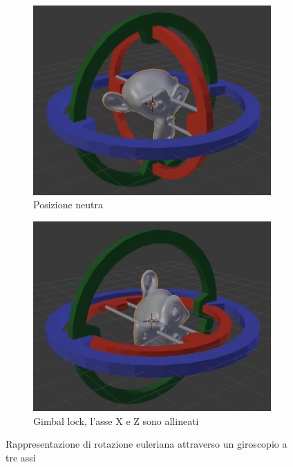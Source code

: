 \begin{figure}[]
\centering
\begin{subfigure}{.5\textwidth}
  \centering
  \includegraphics[width=.9\linewidth]{Figures/euler-1.jpg}
  \caption{Posizione neutra}
  \label{fig:sub1}
\end{subfigure}%
\begin{subfigure}{.5\textwidth}
  \centering
  \includegraphics[width=.9\linewidth]{Figures/euler-2.jpg}
  \caption{Gimbal lock, l'asse X e Z sono allineati}
  \label{fig:sub2}
\end{subfigure}
\decoRule
\caption[Rotazione euleriana]{Rappresentazione di rotazione euleriana attraverso un giroscopio a tre assi}
\label{fig:euler1}
\end{figure}

